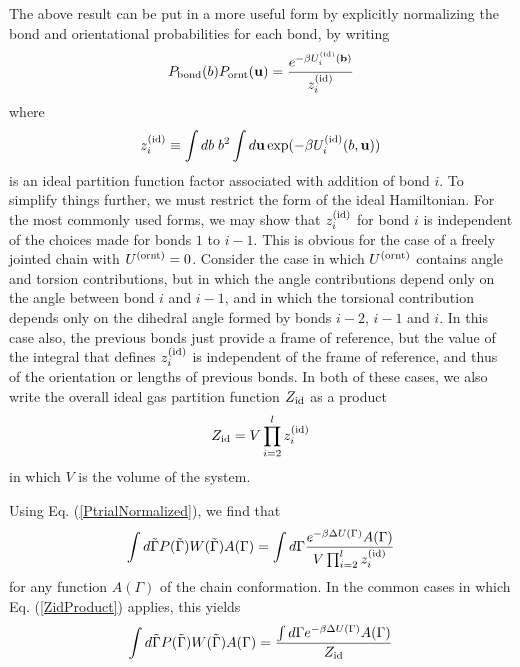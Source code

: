 \documentclass[12pt]{article} %
\newcommand{\vv}[1]{\mathbf{#1}}
\newcommand\chain{\Gamma}
\newcommand\delU{\Delta U}
\newcommand\Uid{U^{({\rm id})}}
\newcommand\Zid{Z_{\rm id}}
\newcommand\nbead{l}
\newcommand\vbond{\vv{b}}
\newcommand\ubond{\vv{u}}
\newcommand\rbond{b}
\newcommand\Uornt{U^{({\rm ornt})}}
\newcommand\Pbond{P_{{\rm bond}}}
\newcommand\Pornt{P_{{\rm ornt}}}
\newcommand\zid{z^{({\rm id})}}
\newcommand\rconfig{\tilde{\chain}}
\begin{document}
The above result can be put in a more useful form by explicitly normalizing the
bond and orientational probabilities for each bond, by writing
\begin{equation}
   \Pbond(\rbond)\Pornt(\ubond) = \frac{e^{-\beta\Uid_{i}(\vbond) }} {\zid_{i}}
   \label{PtrialNormalized}
\end{equation}
where
\begin{equation}
    \zid_{i} \equiv 
    \int d\rbond \; \rbond^{2} \int d\ubond 
    \exp( -\beta \Uid_{i}(\rbond, \ubond) )
\end{equation}
is an ideal partition function factor associated with addition of bond $i$. To 
simplify 
things further, we must restrict the form of the ideal Hamiltonian. For the most
commonly used forms, we may show that $\zid_{i}$ for bond $i$ is independent of
the choices made for bonds $1$ to $i-1$. This is obvious for the case of a freely
jointed chain with $\Uornt=0$.
Consider the case in which $\Uornt$ contains angle and torsion contributions, 
but in which the angle contributions depend only on the angle between bond
$i$ and $i-1$, and in which the torsional contribution depends only on the
dihedral angle formed by bonds $i-2$, $i-1$ and $i$. In this case also, the
previous bonds just provide a frame of reference, but the value of the 
integral that defines $\zid_{i}$ is independent of the frame of reference,
and thus of the orientation or lengths of previous bonds. In both of these
cases, we also write the overall ideal gas partition function $\Zid$ as a 
product
\begin{equation}
    \Zid = V \prod_{i=2}^{\nbead} \zid_{i} 
    \label{ZidProduct}
\end{equation}
in which $V$ is the volume of the system.

Using Eq. (\ref{PtrialNormalized}), we find that
\begin{equation}
    \int d\rconfig P(\rconfig)W(\rconfig) A(\chain) = 
    \int d\chain \frac{e^{-\beta\delU(\chain)}A(\chain)}{ V\prod_{i=2}^{\nbead}\zid_{i}}
\end{equation}
for any function $A(\chain)$ of the chain conformation.  In the common 
cases in which Eq. (\ref{ZidProduct}) applies, this yields
\begin{equation}
    \int d\rconfig P(\rconfig)W(\rconfig) A(\chain) = 
    \frac{\int d\chain e^{-\beta\delU(\chain)}A(\chain)}
         {\Zid} 
\end{equation}
\end{document}
